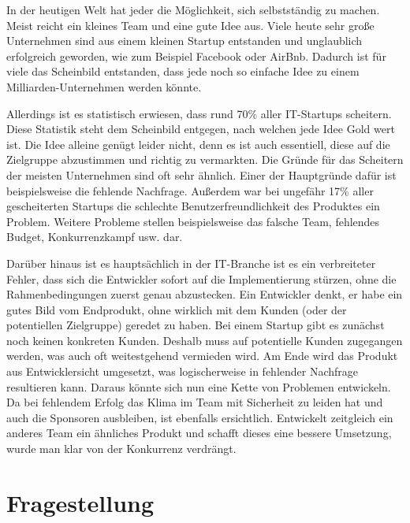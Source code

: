 In der heutigen Welt hat jeder die Möglichkeit, sich selbstständig zu machen. Meist reicht ein kleines Team und eine gute Idee aus. Viele heute sehr große Unternehmen sind aus einem kleinen Startup entstanden und unglaublich erfolgreich geworden, wie zum Beispiel Facebook oder AirBnb. Dadurch ist für viele das Scheinbild entstanden, dass jede noch so einfache Idee zu einem Milliarden-Unternehmen werden könnte. 

Allerdings ist es statistisch erwiesen, dass rund 70\% aller IT-Startups scheitern. \citep{CBInsights_failure} Diese Statistik steht dem Scheinbild entgegen, nach welchen jede Idee Gold wert ist. Die Idee alleine genügt leider nicht, denn es ist auch essentiell, diese auf die Zielgruppe abzustimmen und richtig zu vermarkten. Die Gründe für das Scheitern der meisten Unternehmen sind oft sehr ähnlich. Einer der Hauptgründe dafür ist beispielsweise die fehlende Nachfrage. Außerdem war bei ungefähr 17\% aller gescheiterten Startups die schlechte Benutzerfreundlichkeit des Produktes ein Problem. Weitere Probleme stellen beispielsweise das falsche Team, fehlendes Budget, Konkurrenzkampf usw. dar. \citep{CBInsights_reasons}

Darüber hinaus ist es hauptsächlich in der IT-Branche ist es ein verbreiteter Fehler, dass sich die Entwickler sofort auf die Implementierung stürzen, ohne die Rahmenbedingungen zuerst genau abzustecken. Ein Entwickler denkt, er habe ein gutes Bild vom Endprodukt, ohne wirklich mit dem Kunden (oder der potentiellen Zielgruppe) geredet zu haben. Bei einem Startup gibt es zunächst noch keinen konkreten Kunden. Deshalb muss auf potentielle Kunden zugegangen werden, was auch oft weitestgehend vermieden wird. Am Ende wird das Produkt aus Entwicklersicht umgesetzt, was logischerweise in fehlender Nachfrage resultieren kann. Daraus könnte sich nun eine Kette von Problemen entwickeln. Da bei fehlendem Erfolg das Klima im Team mit Sicherheit zu leiden hat und auch die Sponsoren ausbleiben, ist ebenfalls ersichtlich. Entwickelt zeitgleich ein anderes Team ein ähnliches Produkt und schafft dieses eine bessere Umsetzung, wurde man klar von der Konkurrenz verdrängt.

\section{Fragestellung}


